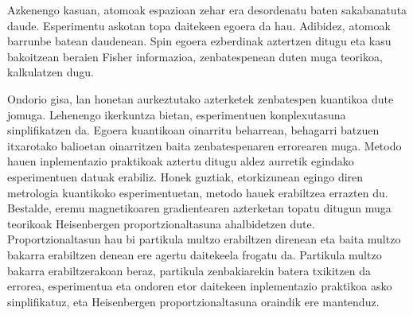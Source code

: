 Azkenengo kasuan, atomoak espazioan zehar era desordenatu baten sakabanatuta daude.
Esperimentu askotan topa daitekeen egoera da hau.
Adibidez, atomoak barrunbe batean daudenean.
Spin egoera ezberdinak aztertzen ditugu eta kasu bakoitzean beraien Fisher informazioa, zenbatespenean duten muga teorikoa, kalkulatzen dugu.

Ondorio gisa, lan honetan aurkeztutako azterketek zenbatespen kuantikoa dute jomuga.
Lehenengo ikerkuntza bietan, esperimentuen konplexutasuna sinplifikatzen da. Egoera kuantikoan oinarritu beharrean, behagarri batzuen itxarotako balioetan oinarritzen baita zenbatespenaren errorearen muga.
Metodo hauen inplementazio praktikoak aztertu ditugu aldez aurretik egindako esperimentuen datuak erabiliz.
Honek guztiak, etorkizunean egingo diren metrologia kuantikoko esperimentuetan, metodo hauek erabiltzea errazten du.
Bestalde, eremu magnetikoaren gradientearen azterketan topatu ditugun muga teorikoak Heisenbergen proportzionaltasuna ahalbidetzen dute.
Proportzionaltasun hau bi partikula multzo erabiltzen direnean eta baita multzo bakarra erabiltzen denean ere agertu daitekeela frogatu da.
Partikula multzo bakarra erabiltzerakoan beraz, partikula zenbakiarekin batera txikitzen da errorea, esperimentua eta ondoren etor daitekeen inplementazio praktikoa asko sinplifikatuz, eta Heisenbergen proportzionaltasuna oraindik ere mantenduz.
